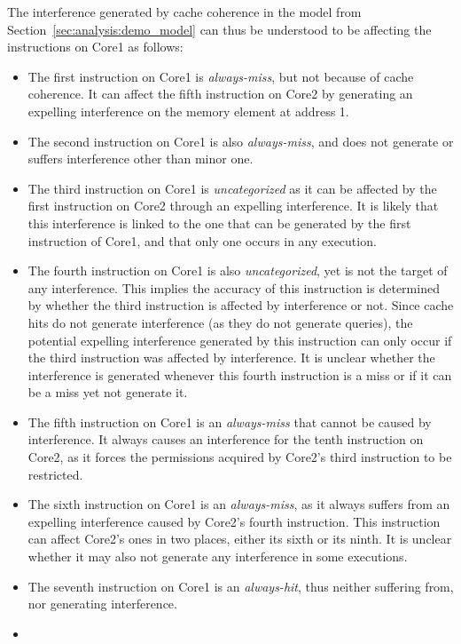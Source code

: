 \begin{example}
The interference generated by cache coherence in the model from
Section~\ref{sec:analysis:demo_model} can thus be understood to be affecting
the instructions on Core1 as follows:
\begin{itemize}
\item
   The first instruction on Core1 is \textit{always-miss}, but not because of
   cache coherence. It can affect the fifth instruction on Core2 by generating
   an expelling interference on the memory element at address 1.
\item
   The second instruction on Core1 is also \textit{always-miss}, and does not
   generate or suffers interference other than minor one.
\item
   The third instruction on Core1 is \textit{uncategorized} as it can be
   affected by the first instruction on Core2 through an expelling
   interference. It is likely that this interference is linked to the one that
   can be generated by the first instruction of Core1, and that only one occurs
   in any execution.
\item
   The fourth instruction on Core1 is also \textit{uncategorized}, yet is not
   the target of any interference. This implies the accuracy of this
   instruction is determined by whether the third instruction is affected by
   interference or not. Since cache hits do not generate interference (as they
   do not generate queries), the potential expelling interference generated by
   this instruction can only occur if the third instruction was affected by
   interference. It is unclear whether the interference is generated whenever
   this fourth instruction is a miss or if it can be a miss yet not generate it.
\item
   The fifth instruction on Core1 is an \textit{always-miss} that cannot be
   caused by interference. It always causes an interference for the tenth
   instruction on Core2, as it forces the permissions acquired by Core2's
   third instruction to be restricted.
\item
   The sixth instruction on Core1 is an \textit{always-miss}, as it always
   suffers from an expelling interference caused by Core2's fourth instruction.
   This instruction can affect Core2's ones in two places, either its sixth or
   its ninth. It is unclear whether it may also not generate any interference
   in some executions.
\item
   The seventh instruction on Core1 is an \textit{always-hit}, thus neither
   suffering from, nor generating interference.
\item

\end{itemize}
\end{example}
